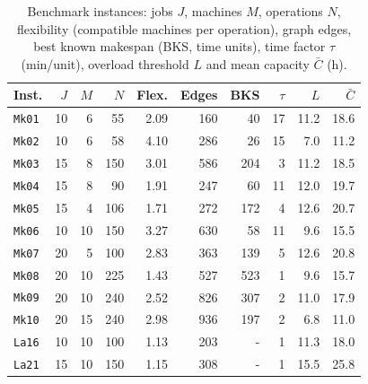 \begin{table}[htbp]
\centering
\caption{Benchmark instances: jobs $J$, machines $M$, operations $N$, flexibility (compatible machines per operation), graph edges, best known makespan (BKS, time units), time factor $\tau$ (min/unit), overload threshold $L$ and mean capacity $\bar C$ (h).}
\label{tab:instances}
\footnotesize
\setlength{\tabcolsep}{2.6pt}
\begin{tabular}{lrrrrrrrrr}
\toprule
Inst. & $J$ & $M$ & $N$ & Flex. & Edges & BKS & $\tau$ & $L$ & $\bar C$ \\
\midrule
\texttt{Mk01} & 10 & 6 & 55 & 2.09 & 160 & 40 & 17 & 11.2 & 18.6 \\
\texttt{Mk02} & 10 & 6 & 58 & 4.10 & 286 & 26 & 15 & 7.0 & 11.2 \\
\texttt{Mk03} & 15 & 8 & 150 & 3.01 & 586 & 204 & 3 & 11.2 & 18.5 \\
\texttt{Mk04} & 15 & 8 & 90 & 1.91 & 247 & 60 & 11 & 12.0 & 19.7 \\
\texttt{Mk05} & 15 & 4 & 106 & 1.71 & 272 & 172 & 4 & 12.6 & 20.7 \\
\texttt{Mk06} & 10 & 10 & 150 & 3.27 & 630 & 58 & 11 & 9.6 & 15.5 \\
\texttt{Mk07} & 20 & 5 & 100 & 2.83 & 363 & 139 & 5 & 12.6 & 20.8 \\
\texttt{Mk08} & 20 & 10 & 225 & 1.43 & 527 & 523 & 1 & 9.6 & 15.7 \\
\texttt{Mk09} & 20 & 10 & 240 & 2.52 & 826 & 307 & 2 & 11.0 & 17.9 \\
\texttt{Mk10} & 20 & 15 & 240 & 2.98 & 936 & 197 & 2 & 6.8 & 11.0 \\
\texttt{La16} & 10 & 10 & 100 & 1.13 & 203 & - & 1 & 11.3 & 18.0 \\
\texttt{La21} & 15 & 10 & 150 & 1.15 & 308 & - & 1 & 15.5 & 25.8 \\
\bottomrule
\end{tabular}
\end{table}

